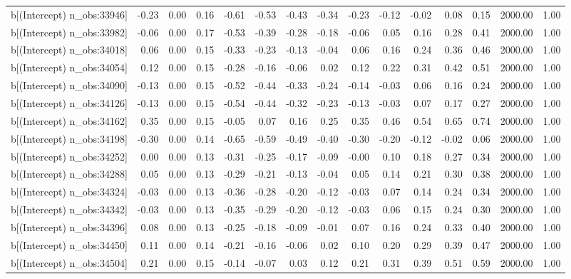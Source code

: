 \begin{table}[ht]
\begin{tabular}{rrrrrrrrrrrrrrr}
  b[(Intercept) n\_obs:33946] & -0.23 & 0.00 & 0.16 & -0.61 & -0.53 & -0.43 & -0.34 & -0.23 & -0.12 & -0.02 & 0.08 & 0.15 & 2000.00 & 1.00 \\ 
  b[(Intercept) n\_obs:33982] & -0.06 & 0.00 & 0.17 & -0.53 & -0.39 & -0.28 & -0.18 & -0.06 & 0.05 & 0.16 & 0.28 & 0.41 & 2000.00 & 1.00 \\ 
  b[(Intercept) n\_obs:34018] & 0.06 & 0.00 & 0.15 & -0.33 & -0.23 & -0.13 & -0.04 & 0.06 & 0.16 & 0.24 & 0.36 & 0.46 & 2000.00 & 1.00 \\ 
  b[(Intercept) n\_obs:34054] & 0.12 & 0.00 & 0.15 & -0.28 & -0.16 & -0.06 & 0.02 & 0.12 & 0.22 & 0.31 & 0.42 & 0.51 & 2000.00 & 1.00 \\ 
  b[(Intercept) n\_obs:34090] & -0.13 & 0.00 & 0.15 & -0.52 & -0.44 & -0.33 & -0.24 & -0.14 & -0.03 & 0.06 & 0.16 & 0.24 & 2000.00 & 1.00 \\ 
  b[(Intercept) n\_obs:34126] & -0.13 & 0.00 & 0.15 & -0.54 & -0.44 & -0.32 & -0.23 & -0.13 & -0.03 & 0.07 & 0.17 & 0.27 & 2000.00 & 1.00 \\ 
  b[(Intercept) n\_obs:34162] & 0.35 & 0.00 & 0.15 & -0.05 & 0.07 & 0.16 & 0.25 & 0.35 & 0.46 & 0.54 & 0.65 & 0.74 & 2000.00 & 1.00 \\ 
  b[(Intercept) n\_obs:34198] & -0.30 & 0.00 & 0.14 & -0.65 & -0.59 & -0.49 & -0.40 & -0.30 & -0.20 & -0.12 & -0.02 & 0.06 & 2000.00 & 1.00 \\ 
  b[(Intercept) n\_obs:34252] & 0.00 & 0.00 & 0.13 & -0.31 & -0.25 & -0.17 & -0.09 & -0.00 & 0.10 & 0.18 & 0.27 & 0.34 & 2000.00 & 1.00 \\ 
  b[(Intercept) n\_obs:34288] & 0.05 & 0.00 & 0.13 & -0.29 & -0.21 & -0.13 & -0.04 & 0.05 & 0.14 & 0.21 & 0.30 & 0.38 & 2000.00 & 1.00 \\ 
  b[(Intercept) n\_obs:34324] & -0.03 & 0.00 & 0.13 & -0.36 & -0.28 & -0.20 & -0.12 & -0.03 & 0.07 & 0.14 & 0.24 & 0.34 & 2000.00 & 1.00 \\ 
  b[(Intercept) n\_obs:34342] & -0.03 & 0.00 & 0.13 & -0.35 & -0.29 & -0.20 & -0.12 & -0.03 & 0.06 & 0.15 & 0.24 & 0.30 & 2000.00 & 1.00 \\ 
  b[(Intercept) n\_obs:34396] & 0.08 & 0.00 & 0.13 & -0.25 & -0.18 & -0.09 & -0.01 & 0.07 & 0.16 & 0.24 & 0.33 & 0.40 & 2000.00 & 1.00 \\ 
  b[(Intercept) n\_obs:34450] & 0.11 & 0.00 & 0.14 & -0.21 & -0.16 & -0.06 & 0.02 & 0.10 & 0.20 & 0.29 & 0.39 & 0.47 & 2000.00 & 1.00 \\ 
  b[(Intercept) n\_obs:34504] & 0.21 & 0.00 & 0.15 & -0.14 & -0.07 & 0.03 & 0.12 & 0.21 & 0.31 & 0.39 & 0.51 & 0.59 & 2000.00 & 1.00 \\ 

\end{tabular}
\end{table}

